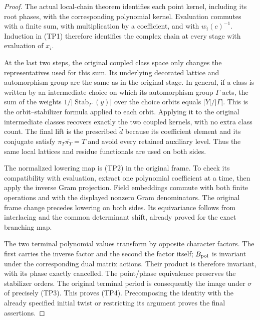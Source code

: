 \begin{proof}
The actual local-chain theorem identifies each point kernel, including
its root phases, with the corresponding polynomial kernel. Evaluation
commutes with a finite sum, with multiplication by a coefficient, and
with $w_i(c)^{-1}$. Induction in (TP1) therefore identifies the complex
chain at every stage with evaluation of $x_i$.

At the last two steps, the original coupled class space only changes
the representatives used for this sum. Its underlying decorated
lattice and automorphism group are the same as in the original
stage. In general, if a class is written by an intermediate choice
on which its automorphism group $\Gamma$ acts, the sum of the
weights $1/|\operatorname{Stab}_\Gamma(y)|$ over the choice orbits
equals $|Y|/|\Gamma|$. This is the orbit--stabilizer formula applied
to each orbit. Applying it to the original intermediate classes
recovers exactly the two coupled kernels, with no extra class count.
The final lift is the prescribed $\widetilde d$ because its
coefficient element and its conjugate satisfy
$\pi_T\overline{\pi_T}=T$ and avoid every retained auxiliary level.
Thus the same local lattices and residue functionals are used on
both sides.\cite{theta-period-source}

The normalized lowering map is (TP2) in the original frame. To check
its compatibility with evaluation, extract one polynomial coefficient
at a time, then apply the inverse Gram projection. Field embeddings
commute with both finite operations and with the displayed nonzero
Gram denominators. The original frame change precedes lowering on
both sides. Its equivariance follows from interlacing and the common
determinant shift, already proved for the exact branching map.

The two terminal polynomial values transform by opposite character
factors. The first carries the inverse factor and the second the
factor itself; $B_{\rm pol}$ is invariant under the corresponding
dual matrix actions. Their product is therefore invariant, with
its phase exactly cancelled. The point/phase equivalence preserves
the stabilizer orders. The original terminal period is consequently
the image under $\sigma$ of precisely (TP3). This proves (TP4).
Precomposing the identity with the already specified initial twist
or restricting its argument proves the final assertions.
\end{proof}

